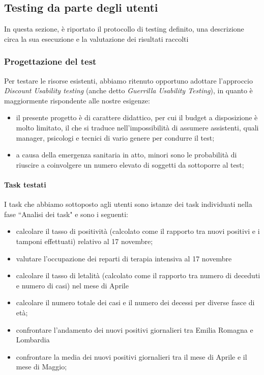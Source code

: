 \subsection{Testing da parte degli utenti}
In questa sezione, è riportato il protocollo di testing definito, una descrizione circa la sua esecuzione e la valutazione dei risultati raccolti
\subsubsection{Progettazione del test}
\label{subsubsection:progettazione-del-test}
Per testare le risorse esistenti, abbiamo ritenuto opportuno adottare l'approccio \textit{Discount Usability testing} (anche detto \textit{Guerrilla Usability Testing}), in quanto è maggiormente rispondente alle nostre esigenze: 
\begin{itemize}
    \item il presente progetto è di carattere didattico, per cui il budget a disposizione è molto limitato, il che si traduce nell'impossibilità di assumere assistenti, quali manager, psicologi e tecnici di vario genere per condurre il test;
    \item a causa della emergenza sanitaria in atto, minori sono le probabilità di riuscire a coinvolgere un numero elevato di soggetti da sottoporre al test;
\end{itemize}

\paragraph{Task testati}
I task che abbiamo sottoposto agli utenti sono istanze dei task individuati nella fase ``Analisi dei task" e sono i seguenti:
\begin{itemize}
    \item calcolare il tasso di positività (calcolato come il rapporto tra nuovi positivi e i tamponi effettuati) relativo al 17 novembre;
    \item valutare l'occupazione dei reparti di terapia intensiva al 17 novembre
    \item calcolare il tasso di letalità (calcolato come il rapporto tra numero di deceduti e numero di casi) nel mese di Aprile
    \item calcolare il numero totale dei casi e il numero dei decessi per diverse fasce di età;
    \item confrontare l'andamento dei nuovi positivi giornalieri tra Emilia Romagna e Lombardia
    \item confrontare la media dei nuovi positivi giornalieri tra il mese di Aprile e il mese di Maggio;
\end{itemize}

